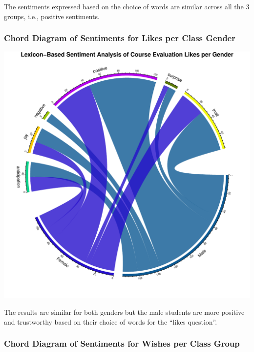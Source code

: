 \documentclass[
]{article}
\begin{document}
The sentiments expressed based on the choice of words are similar across
all the 3 groups, i.e., positive sentiments.

\newpage

\subsubsection{Chord Diagram of Sentiments for Likes per Class
Gender}\label{chord-diagram-of-sentiments-for-likes-per-class-gender}

\includegraphics{Mid-SemesterCourseEvaluation-20240819-20241125-ADB-BBIT2.2_files/figure-latex/ChordDiagramLikesPerGender-1.pdf}

The results are similar for both genders but the male students are more
positive and trustworthy based on their choice of words for the ``likes
question''.

\newpage

\subsubsection{Chord Diagram of Sentiments for Wishes per Class
Group}\label{chord-diagram-of-sentiments-for-wishes-per-class-group}
\end{document}
